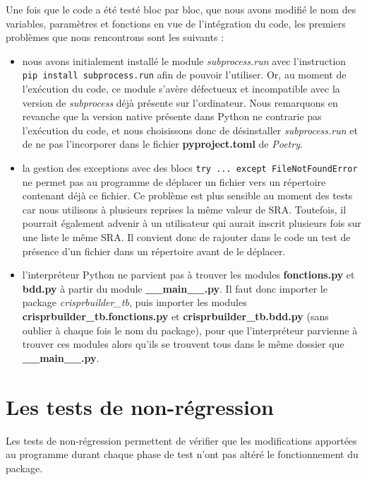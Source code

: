 \documentclass[twoside,a4paper,11pt,frenchb,openany]{report}
\begin{document}
Une fois que le code a été testé bloc par bloc, que nous avons modifié le nom des variables, paramètres et fonctions en vue de l'intégration du code, les premiers problèmes que nous rencontrons sont les suivants :  
\begin{itemize}
\item nous avons initialement installé le module \textit{subprocess.run} avec l'instruction \\\texttt{pip install subprocess.run} afin de pouvoir l'utiliser. Or, au moment de l'exécution du code, ce module s'avère défectueux et incompatible avec la version de \textit{subprocess} déjà présente sur l'ordinateur. Nous remarquons en revanche que la version native présente dans Python ne contrarie pas l'exécution du code, et nous choisissons donc de désinstaller \textit{subprocess.run} et de ne pas l'incorporer dans le fichier \textbf{pyproject.toml} de \textit{Poetry}.
\item la gestion des exceptions avec des blocs \texttt{try ... except FileNotFoundError} ne permet pas au programme de déplacer un fichier vers un répertoire contenant déjà ce fichier. Ce problème est plus sensible au moment des tests car nous utilisons à plusieurs reprises la même valeur de SRA. Toutefois, il pourrait également advenir à un utilisateur qui aurait inscrit plusieurs fois sur une liste le même SRA. Il convient donc de rajouter dans le code un test de présence d'un fichier dans un répertoire avant de le déplacer.
\item l'interpréteur Python ne parvient pas à trouver les modules \textbf{fonctions.py} et \textbf{bdd.py} à partir du module \textbf{\_\_main\_\_.py}. Il faut donc importer le package \textit{crisprbuilder\_tb}, puis importer les modules \textbf{crisprbuilder\_tb.fonctions.py} et \textbf{crisprbuilder\_tb.bdd.py} (sans oublier à chaque fois le nom du package), pour que l'interpréteur parvienne à trouver ces modules alors qu'ils se trouvent tous dans le même dossier que \textbf{\_\_main\_\_.py}.
\end{itemize}






\section{Les tests de non-régression}

Les tests de non-régression permettent de vérifier que les modifications apportées au programme durant chaque phase de test n'ont pas altéré le fonctionnement du package.
\end{document}
